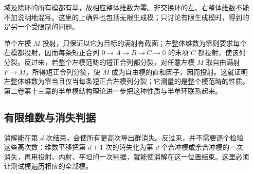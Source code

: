 域及除环的所有模都有基，故相应整体维数为零。非交换环的左、右整体维数不能不加说明地混写。这里的上确界也包括无限生成模；只讨论有限生成模时，得到的是另一个受限制的问题。

\ProseParagraphBreak
单个左模 \(M\) 投射，只保证以它为目标的满射有截面；左整体维数为零则要求每个左模都投射，因而每条短正合列 \(0\to A\to B\to C\to0\) 的末项 \(C\) 都投射，使该列分裂。反过来，若整个左模范畴的短正合列都分裂，对任意左模 \(M\) 取自由满射 \(F\to M\)，所得短正合列分裂，使 \(M\) 成为自由模的直和因子，因而投射。这就证明左整体维数为零当且仅当每条短正合左模列分裂；它测量的是整个模范畴的性质。第二卷第十三章的半单模结构理论进一步把这种性质与半单环联系起来。

\subsection{有限维数与消失判据}
\label{b4:subsec:1001:03}

消解能在第 \(d\) 次结束，会使所有更高次导出群消失。反过来，并不需要逐个检验这些高次数：维数平移把第 \(d+1\) 次的消失化为第 \(d\) 个合冲模或余合冲模的一次消失，再用投射、内射、平坦的一次判据，就能使消解在这一位置结束。这里必须让测试模遍历相应的全部模。

